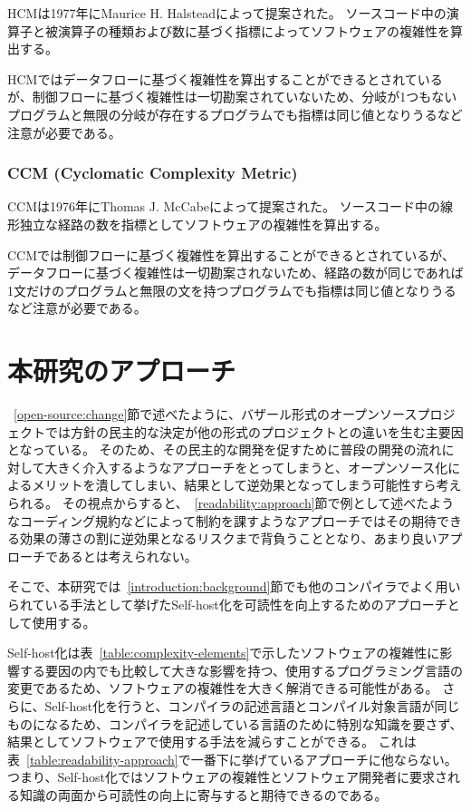 HCMは1977年にMaurice H. Halsteadによって提案された。
ソースコード中の演算子と被演算子の種類および数に基づく指標によってソフトウェアの複雑性を算出する。

HCMではデータフローに基づく複雑性を算出することができるとされているが、制御フローに基づく複雑性は一切勘案されていないため、分岐が1つもないプログラムと無限の分岐が存在するプログラムでも指標は同じ値となりうるなど注意が必要である。

\subsubsection{CCM (Cyclomatic Complexity Metric)}

CCMは1976年にThomas J. McCabeによって提案された。
ソースコード中の線形独立な経路の数を指標としてソフトウェアの複雑性を算出する。

CCMでは制御フローに基づく複雑性を算出することができるとされているが、データフローに基づく複雑性は一切勘案されないため、経路の数が同じであれば1文だけのプログラムと無限の文を持つプログラムでも指標は同じ値となりうるなど注意が必要である。

\section{本研究のアプローチ}
\label{readability:idea}

~\ref{open-source:change}節で述べたように、バザール形式のオープンソースプロジェクトでは方針の民主的な決定が他の形式のプロジェクトとの違いを生む主要因となっている。
そのため、その民主的な開発を促すために普段の開発の流れに対して大きく介入するようなアプローチをとってしまうと、オープンソース化によるメリットを潰してしまい、結果として逆効果となってしまう可能性すら考えられる。
その視点からすると、~\ref{readability:approach}節で例として述べたようなコーディング規約などによって制約を課すようなアプローチではその期待できる効果の薄さの割に逆効果となるリスクまで背負うこととなり、あまり良いアプローチであるとは考えられない。

そこで、本研究では~\ref{introduction:background}節でも他のコンパイラでよく用いられている手法として挙げたSelf-host化を可読性を向上するためのアプローチとして使用する。

Self-host化は表~\ref{table:complexity-elements}で示したソフトウェアの複雑性に影響する要因の内でも比較して大きな影響を持つ、使用するプログラミング言語の変更であるため、ソフトウェアの複雑性を大きく解消できる可能性がある。
さらに、Self-host化を行うと、コンパイラの記述言語とコンパイル対象言語が同じものになるため、コンパイラを記述している言語のために特別な知識を要さず、結果としてソフトウェアで使用する手法を減らすことができる。
これは表~\ref{table:readability-approach}で一番下に挙げているアプローチに他ならない。
つまり、Self-host化ではソフトウェアの複雑性とソフトウェア開発者に要求される知識の両面から可読性の向上に寄与すると期待できるのである。

